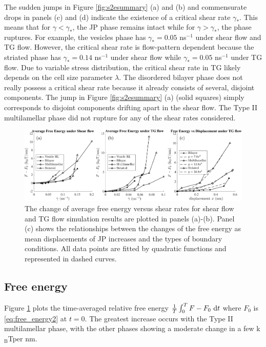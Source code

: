 \documentclass[prb,preprint,showpacs,preprintnumbers,amsmath,amssymb,longbibliography]{revtex4-1}
\newcommand{\KBT}{k$_{\text{B}}$T}
\begin{document}
The sudden jumps in  Figure \ref{fig:s2esummary} (a) and (b)
and commensurate drops in panels (c) and (d) indicate
the existence of a critical shear rate $\gamma_*$.  This means that 
for $\gamma < \gamma_*$, the JP phase remains intact while
for $\gamma > \gamma_*$, the phase ruptures. 
For example, the vesicles phase has 
$\gamma_* = 0.05$ ns$^{-1}$ 
under shear flow and TG flow. However, the critical shear rate
is flow-pattern dependent because 
the striated phase has $\gamma_* = 0.14$ ns$^{-1}$ under shear flow
while $\gamma_* = 0.05$ ns$^{-1}$ under  TG flow.
Due to variable stress distribution, 
the critical shear rate in TG likely 
depends on the cell size parameter $\lambda$.
The disordered bilayer phase does not really possess a critical
shear rate because it already consists of several, disjoint components.
The jump in Figure \ref{fig:s2esummary} (a) (solid squares)
simply corresponds to disjoint components drifting apart in the shear
flow.  The Type II multilamellar phase did
not rupture for any of the shear rates considered.   

\begin{figure}[t]
\begin{center}
\includegraphics[width=\textwidth]{FSummary.pdf}
\end{center}
\caption{\label{fig:fsummary}
The change of average free energy versus shear rates for shear flow and TG flow simulation results are plotted in panels (a)-(b). Panel (c) shows the relationships between the changes of the free energy as mean displacements of JP increases and the types of boundary conditions. All data points are fitted by quadratic functions and represented in dashed curves.}
\end{figure}

\subsection{Free energy}
Figure \ref{fig:fsummary} plots the time-averaged
relative free energy $\frac{1}{T}\int_0^T F - F_0 \,\dif t$ where $F_0$ is 
\eqref{eq:free_energy2} at $t = 0$.  The 
greatest increase occurs with the Type II 
multilamellar phase, with the other phases 
showing a moderate change in a few \KBT\;per 
nm.    
\end{document}
